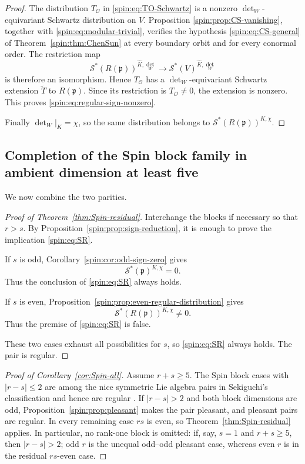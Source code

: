 \documentclass[10pt,a4paper]{amsart}
\numberwithin{equation}{section}
\newcommand{\fp}{\mathfrak p}
\newcommand{\cO}{\mathcal O}
\newcommand{\cS}{\mathcal S}
\begin{document}
\begin{proof}
The distribution $T_{\cO}$ in \eqref{spin:eq:TO-Schwartz} is a nonzero
$\det_W$-equivariant Schwartz distribution on $V$.  Proposition
\ref{spin:prop:CS-vanishing}, together with
\eqref{spin:eq:modular-trivial}, verifies the hypothesis
\eqref{spin:eq:CS-general} of Theorem~\ref{spin:thm:ChenSun} at every boundary orbit and
for every conormal order.  The restriction map
\[
  \cS^*(R(\fp))^{\widehat K,\det_W}
  \longrightarrow
  \cS^*(V)^{\widehat K,\det_W}
\]
is therefore an isomorphism.  Hence $T_{\cO}$ has a
$\det_W$-equivariant Schwartz extension $\widetilde T$ to $R(\fp)$.  Since
its restriction is $T_{\cO}\ne0$, the extension is nonzero.  This proves
\eqref{spin:eq:regular-sign-nonzero}.

Finally $\det_W|_K=\chi$, so the same distribution belongs to
$\cS^*(R(\fp))^{K,\chi}$.
\end{proof}

\subsection{Completion of the Spin block family in ambient dimension at least five}\label{spin:sec:conclusion}

We now combine the two parities.

\begin{proof}[Proof of Theorem~\ref{thm:Spin-residual}]
Interchange the blocks if necessary so that $r>s$.  By
Proposition~\ref{spin:prop:sign-reduction}, it is enough to prove the implication
\eqref{spin:eq:SR}.

If $s$ is odd, Corollary~\ref{spin:cor:odd-sign-zero} gives
\[
  \cS^*(\fp)^{K,\chi}=0.
\]
Thus the conclusion of \eqref{spin:eq:SR} always holds.

If $s$ is even, Proposition~\ref{spin:prop:even-regular-distribution} gives
\[
  \cS^*(R(\fp))^{K,\chi}\ne0.
\]
Thus the premise of \eqref{spin:eq:SR} is false.

These two cases exhaust all possibilities for $s$, so \eqref{spin:eq:SR} always
holds.  The pair is regular.
\end{proof}

\begin{proof}[Proof of Corollary~\ref{cor:Spin-all}]
Assume $r+s\ge5$.  The Spin block cases with $|r-s|\le2$ are among the
nice symmetric Lie algebra pairs in Sekiguchi's classification and hence are
regular \cite[Lemmas~4.21--4.22 and Table~3]{Rubio}.  If $|r-s|>2$ and both
block dimensions are odd, Proposition~\ref{spin:prop:pleasant} makes the pair
pleasant, and pleasant pairs are regular.  In every remaining case $rs$ is
even, so Theorem~\ref{thm:Spin-residual} applies.  In particular, no
rank-one block is omitted: if, say, $s=1$ and $r+s\ge5$, then
$|r-s|>2$; odd $r$ is the unequal odd--odd pleasant case, whereas even $r$ is
in the residual $rs$-even case.
\end{proof}
\end{document}
